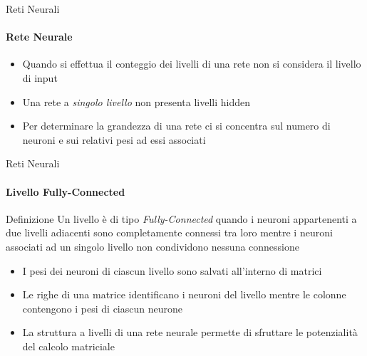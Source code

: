 \documentclass[
 ]{beamer}
\begin{document}
\begin{frame}{Reti Neurali}
    \framesubtitle{Rete Neurale}
    
    \begin{itemize} [<+->]
        \setlength\itemsep{3em}
        \item \large Quando si effettua il conteggio dei livelli di una rete non si considera il livello di input
        \item \large Una rete a \emph{singolo livello} non presenta livelli hidden    
        \item \large Per determinare la grandezza di una rete ci si concentra sul numero di neuroni e sui relativi pesi ad essi associati
    \end{itemize}
\end{frame}

\begin{frame}{Reti Neurali}
    \framesubtitle{Livello Fully-Connected}
    
    \begin{block}{Definizione} 
        \large Un livello è di tipo \emph{Fully-Connected} quando i neuroni appartenenti a due livelli adiacenti sono completamente connessi tra loro mentre i neuroni associati ad un singolo livello non condividono nessuna connessione 
    \end{block}\pause
    
    \begin{itemize} [<+->]
        \setlength\itemsep{1.5em}
        \item \large I pesi dei neuroni di ciascun livello sono salvati all'interno di matrici
        \item \large Le righe di una matrice identificano i neuroni del livello mentre le colonne contengono i pesi di ciascun neurone
        \item \large La struttura a livelli di una rete neurale permette di sfruttare le potenzialità del calcolo matriciale 
    \end{itemize}
\end{frame}
\end{document}
